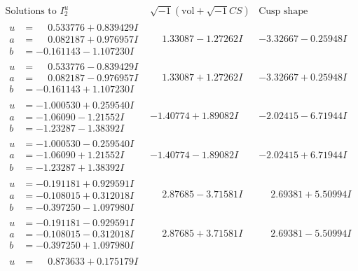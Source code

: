 \documentclass[1p]{elsarticle_modified}
\theoremstyle{definition}
\newcommand{\I}{\sqrt{-1}}
\begin{document}
$$\begin{array}{c|c|c}  
\text{Solutions to }I^u_{2}& \I (\text{vol} + \sqrt{-1}CS) & \text{Cusp shape}\\
 \hline 
\begin{aligned}
u &= \phantom{-}0.533776 + 0.839429 I \\
a &= \phantom{-}0.082187 + 0.976957 I \\
b &= -0.161143 - 1.107230 I\end{aligned}
 & \phantom{-}1.33087 - 1.27262 I & -3.32667 - 0.25948 I \\ \hline\begin{aligned}
u &= \phantom{-}0.533776 - 0.839429 I \\
a &= \phantom{-}0.082187 - 0.976957 I \\
b &= -0.161143 + 1.107230 I\end{aligned}
 & \phantom{-}1.33087 + 1.27262 I & -3.32667 + 0.25948 I \\ \hline\begin{aligned}
u &= -1.000530 + 0.259540 I \\
a &= -1.06090 - 1.21552 I \\
b &= -1.23287 - 1.38392 I\end{aligned}
 & -1.40774 + 1.89082 I & -2.02415 - 6.71944 I \\ \hline\begin{aligned}
u &= -1.000530 - 0.259540 I \\
a &= -1.06090 + 1.21552 I \\
b &= -1.23287 + 1.38392 I\end{aligned}
 & -1.40774 - 1.89082 I & -2.02415 + 6.71944 I \\ \hline\begin{aligned}
u &= -0.191181 + 0.929591 I \\
a &= -0.108015 + 0.312018 I \\
b &= -0.397250 - 1.097980 I\end{aligned}
 & \phantom{-}2.87685 - 3.71581 I & \phantom{-}2.69381 + 5.50994 I \\ \hline\begin{aligned}
u &= -0.191181 - 0.929591 I \\
a &= -0.108015 - 0.312018 I \\
b &= -0.397250 + 1.097980 I\end{aligned}
 & \phantom{-}2.87685 + 3.71581 I & \phantom{-}2.69381 - 5.50994 I \\ \hline\begin{aligned}
u &= \phantom{-}0.873633 + 0.175179 I \\

\end{aligned}
\end{array}$$
\end{document}
